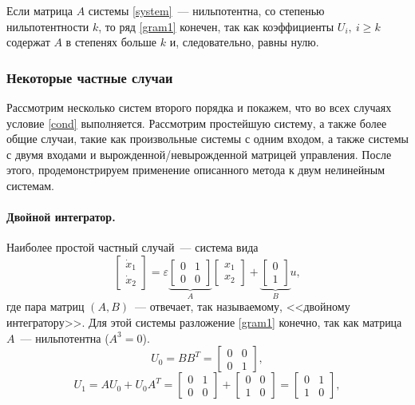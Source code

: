 \documentclass[../main.tex]{subfiles}
\begin{document}
 Если матрица $ A $ системы \eqref{system}~--- нильпотентна, со степенью нильпотентности $ k $, то ряд \eqref{gram1} конечен, так как коэффициенты $ U_i, \ i \geq k$ содержат $ A $ в степенях больше $ k$ и, следовательно, равны нулю.  
 \subsubsection{Некоторые частные случаи}
 Рассмотрим несколько систем второго порядка и покажем, что во всех случаях условие \eqref{cond} выполняется. Рассмотрим простейшую систему, а также более общие случаи, такие как произвольные системы с одним входом, а также системы с двумя входами и вырожденной/невырожденной матрицей управления. После этого, продемонстрируем применение описанного метода к двум нелинейным системам.
 \paragraph{Двойной интегратор.}
 Наиболее простой частный случай~--- система вида 
 \begin{equation*}
	 \left[ {\begin{array}{*{20}{c}}
			 {{{\dot x}_1}}\\
			 {{{\dot x}_2}}
	 \end{array}} \right] = \varepsilon \underbrace {\left[ {\begin{array}{*{20}{c}}
				 0&1\\
				 0&0
		 \end{array}} \right]}_A\left[ {\begin{array}{*{20}{c}}
			 {{x_1}}\\
			 {{x_2}}
	 \end{array}} \right] + \underbrace {\left[ {\begin{array}{*{20}{c}}
				 0\\
				 1
		 \end{array}} \right]}_Bu,
 \end{equation*}
 где пара матриц $ (A,B) $~--- отвечает, так называемому, <<двойному интегратору>>.
 Для этой системы разложение \eqref{gram1} конечно, так как матрица $ A $~--- нильпотентна ($ A^3 = 0$).
 \begin{equation*}
	 U_0 = B B^T =  \left[ {\begin{array}{*{20}{c}}
			 0&0\\
			 0&1
	 \end{array}}\right],
 \end{equation*}
 \begin{equation*}
	 U_1 = A U_0 + U_0 A^T = \left[ {\begin{array}{*{20}{c}}
			 0&1\\
			 0&0
	 \end{array}}\right] + \left[ {\begin{array}{*{20}{c}}
			 0&0\\
			 1&0
	 \end{array}}\right] = \left[ {\begin{array}{*{20}{c}}
			 0&1\\
			 1&0
	 \end{array}}\right],
 \end{equation*}
\end{document}
